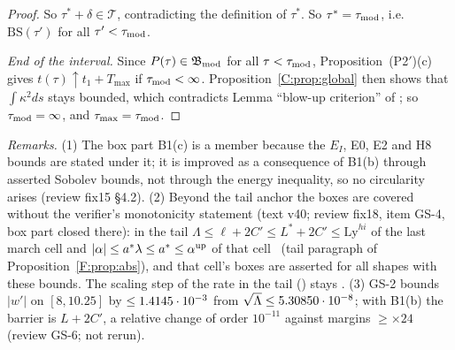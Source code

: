 \documentclass[11pt]{article}
\begin{document}
\begin{proof}
So $\tau^*+\delta\in\mathcal T$, contradicting the definition of $\tau^*$. So $\tau^*=\tau_{\rm mod}$, i.e.\ $\mathrm{BS}(\tau')$ for all $\tau'<\tau_{\rm mod}$.

\emph{End of the interval.} Since $P(\tau)\in\mathfrak B_{\rm mod}$ for all $\tau<\tau_{\rm mod}$, Proposition~(P2$'$)(c) gives $t(\tau)\uparrow t_1+T_{\max}$ if $\tau_{\rm mod}<\infty$. Proposition~\ref{C:prop:global} then shows that $\int\kappa^2ds$ stays bounded, which contradicts Lemma ``blow-up criterion'' of ; so $\tau_{\rm mod}=\infty$, and $\tau_{\max}=\tau_{\rm mod}$.
\end{proof}
\noindent\emph{Remarks.} (1) The box part B1(c) is a member because the $E_I$, E0, E2 and H8 bounds are stated under it; it is improved as a consequence of B1(b) through asserted Sobolev bounds, not through the energy inequality, so no circularity arises (review fix15 \S4.2). (2) Beyond the tail anchor the boxes are covered without the verifier's monotonicity statement (text v40; review fix18, item GS-4, box part closed there): in the tail $\Lambda\le\ell+2C'\le L^*+2C'\le\mathrm{Ly}^{hi}$ of the last march cell and $|\alpha|\le a^*\lambda\le a^*\le\alpha^{\rm up}$ of that cell \tC\ (tail paragraph of Proposition~\ref{F:prop:abs}), and that cell's boxes are asserted for all shapes with these bounds. The scaling step of the rate in the tail () stays \tR. (3) GS-2 bounds $|w'|$ on $[8,10.25]$ by $\le1.4145\cdot10^{-3}$ from $\sqrt\Lambda\le5.30850\cdot10^{-8}$; with B1(b) the barrier is $L+2C'$, a relative change of order $10^{-11}$ against margins $\ge\times24$ (review GS-6; not rerun).
\ifdefined\stepmain\else
\end{document}
